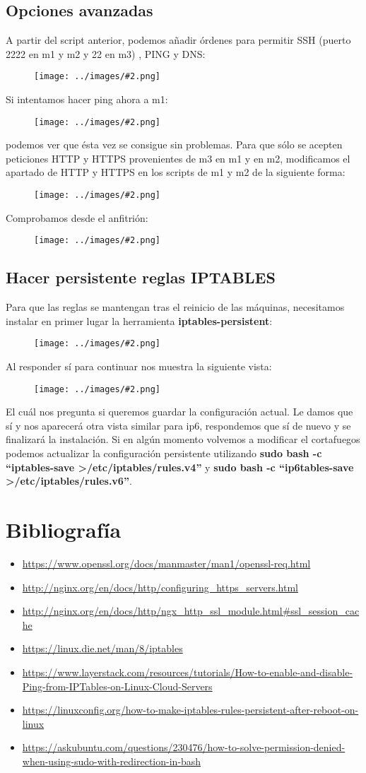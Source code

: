 \documentclass[twoside]{article}
\newcommand{\enquote}[1]{``#1''}
\newcommand{\image}[2]{
\begin{figure}[H]
    \texttt{[image: ../images/\#2.png]}
    \centering
\end{figure}
}
\begin{document}
\subsection{Opciones avanzadas}
A partir del script anterior, podemos añadir órdenes para permitir SSH (puerto 2222 en m1 y m2 y 22 en m3) , PING y DNS:
\image{8}{24}
Si intentamos hacer ping ahora a m1:
\image{8}{25}
podemos ver que ésta vez se consigue sin problemas. Para que sólo se acepten peticiones HTTP y HTTPS provenientes de m3 en m1 y en m2, modificamos el apartado de HTTP y HTTPS en los scripts de m1 y m2 de la siguiente forma:
\image{8}{26}
Comprobamos desde el anfitrión:
\image{8}{27}

\subsection{Hacer persistente reglas IPTABLES}
Para que las reglas se mantengan tras el reinicio de las máquinas, necesitamos instalar en primer lugar la herramienta \textbf{iptables-persistent}:
\image{8}{28}
Al responder sí para continuar nos muestra la siguiente vista:
\image{8}{29}
El cuál nos pregunta si queremos guardar la configuración actual. Le damos que sí y nos aparecerá otra vista similar para ip6, respondemos que sí de nuevo y se finalizará la instalación. 
Si en algún momento volvemos a modificar el cortafuegos podemos actualizar la configuración persistente utilizando \textbf{sudo bash -c \enquote{iptables-save \textgreater /etc/iptables/rules.v4}} y \textbf{sudo bash -c \enquote{ip6tables-save \textgreater /etc/iptables/rules.v6}}. 

\newpage
\section{Bibliografía}
\begin{itemize}
    \item \url{https://www.openssl.org/docs/manmaster/man1/openssl-req.html}
    \item \url{http://nginx.org/en/docs/http/configuring_https_servers.html}
    \item \url{http://nginx.org/en/docs/http/ngx_http_ssl_module.html#ssl_session_cache}
    \item \url{https://linux.die.net/man/8/iptables}
    \item \url{https://www.layerstack.com/resources/tutorials/How-to-enable-and-disable-Ping-from-IPTables-on-Linux-Cloud-Servers}
    \item \url{https://linuxconfig.org/how-to-make-iptables-rules-persistent-after-reboot-on-linux}
    \item \url{https://askubuntu.com/questions/230476/how-to-solve-permission-denied-when-using-sudo-with-redirection-in-bash}
\end{itemize}
\end{document}
